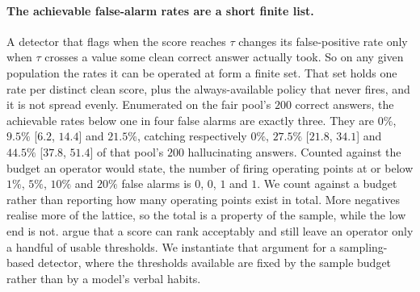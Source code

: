 \paragraph{The achievable false-alarm rates are a short finite list.}
A detector that flags when the score reaches $\tau$ changes its false-positive rate only when
$\tau$ crosses a value some clean correct answer actually took. So on any given population
the rates it can be operated at form a finite set. That set holds one rate per distinct
clean score, plus the always-available policy that never fires, and it is not spread evenly.
Enumerated on the
fair pool's $200$ correct answers, the achievable rates below one in four false alarms are
exactly three. They are $0\%$, $9.5\%$ [$6.2$, $14.4$] and $21.5\%$, catching respectively $0\%$,
$27.5\%$ [$21.8$, $34.1$] and $44.5\%$ [$37.8$, $51.4$] of that pool's $200$ hallucinating
answers. Counted against the budget an operator would state, the number of firing operating
points at or below $1\%$, $5\%$, $10\%$ and $20\%$ false alarms is $0$, $0$, $1$ and $1$. We
count against a budget rather than reporting how many operating points exist in total. More
negatives realise more of the lattice, so the total is a property of the sample, while the
low end is not. \citet{sun2026granularity} argue that a score can rank acceptably and still
leave an operator only a handful of usable thresholds. We instantiate that argument for
a sampling-based detector, where the
thresholds available are fixed by the sample budget rather than by a model's verbal habits.

